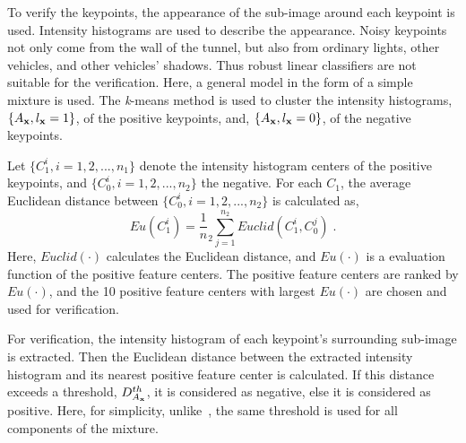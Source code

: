 To verify the keypoints, the appearance of the sub-image around each keypoint is used. Intensity histograms are used to describe the appearance. Noisy keypoints not only come from the wall of the tunnel, but also from ordinary lights, other vehicles, and other vehicles' shadows. Thus robust linear classifiers are not suitable for the verification. Here, a general model in the form of a simple mixture is used. The \emph{k}-means method is used to cluster the intensity histograms, $\{A_{\bf{x}},l_{\bf{x}}=1\}$, of the positive keypoints, and, $\{A_{\bf{x}},l_{\bf{x}}=0\}$,  of
the negative keypoints.

Let $\{C_1^i,i=1,2,...,n_1\}$ denote the intensity histogram centers of the positive keypoints, and $\{C_0^i,i=1,2,...,n_2\}$ the negative. For each $C_1$, the average Euclidean distance between $\{C_0^i,i=1,2,...,n_2\}$ is calculated as,
\begin{equation}
Eu(C_1^i)={\frac 1 n_2}\sum\limits^{n_2}_{j=1}Euclid(C_1^i,C_0^j)\;.
\label{eq2}
\end{equation}
Here, $Euclid(\cdot)$ calculates the Euclidean distance, and $Eu(\cdot)$ is a evaluation function of the positive feature centers. The positive feature centers are ranked by $Eu(\cdot)$, and the 10 positive feature centers with largest $Eu(\cdot)$ are chosen and used for verification.

For verification, the intensity histogram of each keypoint's surrounding sub-image is extracted. Then the Euclidean distance between the extracted intensity histogram and its nearest positive feature center is calculated. If this distance exceeds a threshold, $D^{th}_{A_{\bf{x}}}$, it is considered as negative, else it is considered as positive. Here, for simplicity, unlike~\cite{ac33}, the same threshold is used for all components of the mixture.

